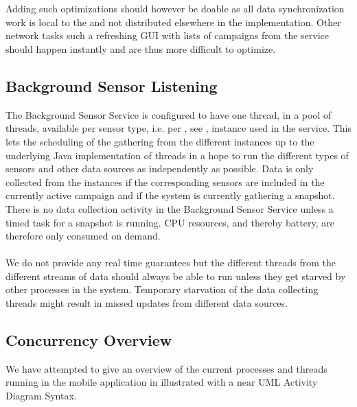 \\\\
Adding such optimizations should however be doable as all data synchronization work is local to the  and not distributed elsewhere in the implementation. Other network tasks such a refreshing GUI with lists of campaigns from the service should happen instantly and are thus more difficult to optimize. 

\subsection{Background Sensor Listening}
The Background Sensor Service is configured to have one thread, in a pool of threads, available per sensor type, i.e. per , see , instance used in the service. This lets the scheduling of the gathering from the different  instances up to the underlying Java implementation of threads in a hope to run the different types of sensors and other data sources as independently as possible. Data is only collected from the  instances if the corresponding sensors are included in the currently active campaign and if the system is currently gathering a snapshot. There is no data collection activity in the Background Sensor Service unless a timed task for a snapshot is running. CPU resources, and thereby battery, are therefore only consumed on demand.
\\\\
We do not provide any real time guarantees but the different threads from the different streams of data should always be able to run unless they get starved by other processes in the system. Temporary starvation of the data collecting threads might result in missed updates from different data sources. 

\subsection{Concurrency Overview}
We have attempted to give an overview of the current processes and threads running in the mobile application in  illustrated with a near UML Activity Diagram Syntax. 

